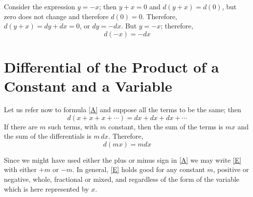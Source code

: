 Consider the expression
$y = -x$; then $y + x = 0$
and
$d(y + x) = d(0)$,
but zero does not change and therefore $d(0) = 0$. Therefore,
$d(y + x) = dy + dx = 0$, or $dy = -dx$.
But $y = -x$; therefore,
\[d(-x) = -dx \tag{D} \label{D}\]

\section{Differential of the Product of a Constant and a Variable}
Let us refer now to formula \eqref{A} and suppose all the terms to be the same; then
\[d(x + x + x + \cdots) = dx + dx + dx + \cdots\]
If there are $m$ such terms, with $m$ constant, then the sum of the terms is $mx$ and the sum of the differentials is $m\,dx$. Therefore,
\[d(mx) = mdx \tag{E} \label{E}\]

Since we might have used either the plus or minus sign in \eqref{A} we may write \eqref{E} with either $+m$ or $-m$. In general, \eqref{E} holds good for any constant $m$, positive or negative, whole, fractional or mixed, and regardless of the form of the variable which is here represented by $x$.

